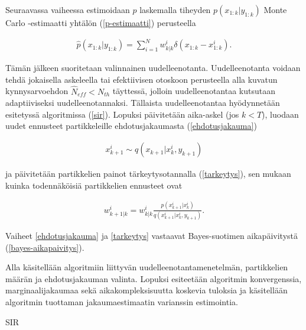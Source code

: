 \documentclass[
  12pt,
  a4paper, twoside]{book}
\begin{document}
\noindent Seuraavassa vaiheessa estimoidaan \(p\) laskemalla tiheyden \(p(x_{1:k}|y_{1:k})\) Monte Carlo -estimaatti yhtälön (\ref{p-estimaatti}) perusteella

\begin{align}\label{p-estimaatti}
\hat{p}(x_{1:k}|y_{1:k})=\sum_{i=1}^{N}w_{k|k}^i \delta(x_{1:k}-x_{1:k}^i).
\end{align}

Tämän jälkeen suoritetaan valinnainen uudelleenotanta. Uudelleenotanta voidaan tehdä jokaisella askeleella tai efektiivisen otoskoon perusteella alla kuvatun kynnysarvoehdon \(\hat{N}_{eff}< N_{th}\) täyttessä, jolloin uudelleenotantaa kutsutaan adaptiiviseksi uudelleenotannaksi. Tällaista uudelleenotantaa hyödynnetään esitetyssä algoritmissa (\ref{sir}). Lopuksi päivitetään aika-askel (jos \(k < T\)), luodaan uudet ennusteet partikkeleille ehdotusjakaumasta (\ref{ehdotusjakauma})

\begin{align}\label{ehdotusjakauma}
x_{k+1}^i\sim q(x_{k+1}|x_k^i,y_{k+1})
\end{align}

\noindent ja päivitetään partikkelien painot tärkeytysotannalla (\ref{tarkeytys}), sen mukaan kuinka todennäköisiä partikkelien ennusteet ovat

\begin{align}\label{tarkeytys} w_{k+1|k}^i=w_{k|k}^i\frac{p(x_{k+1}^i|x_k^i)}{q(x_{k+1}^i|x_k^i,y_{k+1})}.
\end{align}

\noindent Vaiheet \ref{ehdotusjakauma} ja \ref{tarkeytys} vastaavat Bayes-suotimen aikapäivitystä (\ref{bayes-aikapaivitys}).

Alla käsitellään algoritmiin liittyvän uudelleenotantamenetelmän, partikkelien määrän ja ehdotusjakauman valinta. Lopuksi esiteetään algoritmin konvergenssia, marginaalijakaumaa sekä aikakompleksisuutta koskevia tuloksia ja käsitellään algoritmin tuottaman jakaumaestimaatin varianssin estimointia.

\begin{algorithm}[H]
\label{sir}
\DontPrintSemicolon
\SetAlgoShortEnd
{}
\caption{SIR}
\end{algorithm}
\end{document}

